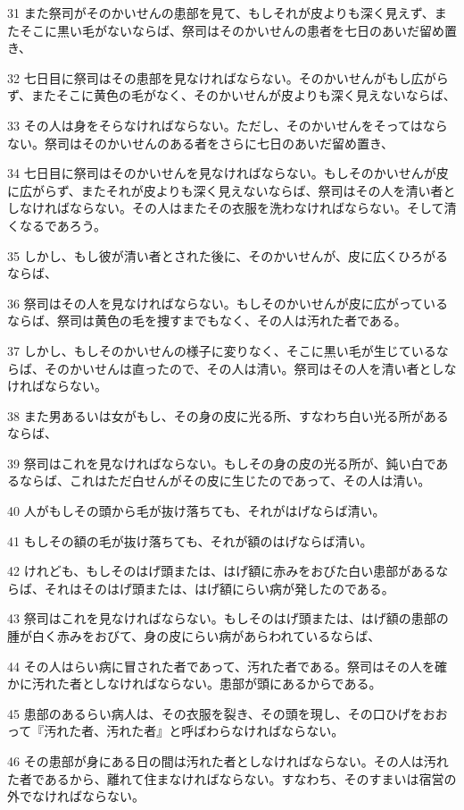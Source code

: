 \par 31 また祭司がそのかいせんの患部を見て、もしそれが皮よりも深く見えず、またそこに黒い毛がないならば、祭司はそのかいせんの患者を七日のあいだ留め置き、
\par 32 七日目に祭司はその患部を見なければならない。そのかいせんがもし広がらず、またそこに黄色の毛がなく、そのかいせんが皮よりも深く見えないならば、
\par 33 その人は身をそらなければならない。ただし、そのかいせんをそってはならない。祭司はそのかいせんのある者をさらに七日のあいだ留め置き、
\par 34 七日目に祭司はそのかいせんを見なければならない。もしそのかいせんが皮に広がらず、またそれが皮よりも深く見えないならば、祭司はその人を清い者としなければならない。その人はまたその衣服を洗わなければならない。そして清くなるであろう。
\par 35 しかし、もし彼が清い者とされた後に、そのかいせんが、皮に広くひろがるならば、
\par 36 祭司はその人を見なければならない。もしそのかいせんが皮に広がっているならば、祭司は黄色の毛を捜すまでもなく、その人は汚れた者である。
\par 37 しかし、もしそのかいせんの様子に変りなく、そこに黒い毛が生じているならば、そのかいせんは直ったので、その人は清い。祭司はその人を清い者としなければならない。
\par 38 また男あるいは女がもし、その身の皮に光る所、すなわち白い光る所があるならば、
\par 39 祭司はこれを見なければならない。もしその身の皮の光る所が、鈍い白であるならば、これはただ白せんがその皮に生じたのであって、その人は清い。
\par 40 人がもしその頭から毛が抜け落ちても、それがはげならば清い。
\par 41 もしその額の毛が抜け落ちても、それが額のはげならば清い。
\par 42 けれども、もしそのはげ頭または、はげ額に赤みをおびた白い患部があるならば、それはそのはげ頭または、はげ額にらい病が発したのである。
\par 43 祭司はこれを見なければならない。もしそのはげ頭または、はげ額の患部の腫が白く赤みをおびて、身の皮にらい病があらわれているならば、
\par 44 その人はらい病に冒された者であって、汚れた者である。祭司はその人を確かに汚れた者としなければならない。患部が頭にあるからである。
\par 45 患部のあるらい病人は、その衣服を裂き、その頭を現し、その口ひげをおおって『汚れた者、汚れた者』と呼ばわらなければならない。
\par 46 その患部が身にある日の間は汚れた者としなければならない。その人は汚れた者であるから、離れて住まなければならない。すなわち、そのすまいは宿営の外でなければならない。
